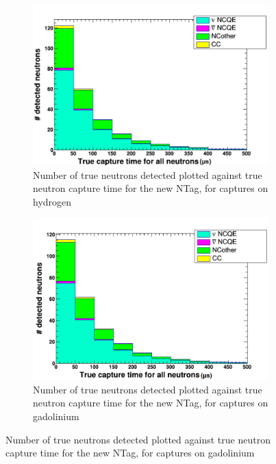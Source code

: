 \begin{figure}
    \centering
     \begin{subfigure}[b]{0.45\linewidth}
      \includegraphics[width=\linewidth]{Figures/TruCapTimeReductionNewH.PNG}
      \caption{Number of true neutrons detected plotted against true neutron capture time for the new NTag, for captures on hydrogen}
      \label{fig:TrueCapTimeReductionNewH} 
     \end{subfigure}
     \begin{subfigure}[b]{0.45\linewidth}
       \includegraphics[width=\linewidth]{Figures/TruCapTimeReductionNewGd.PNG}
        \caption{Number of true neutrons detected plotted against true neutron capture time for the new NTag, for captures on gadolinium} 
     \label{fig:TrueCapTimeReductionNewGd}
      \end{subfigure} 
\end{figure}



